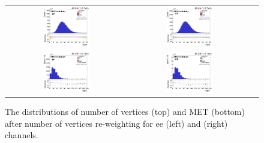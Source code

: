\begin{figure}[ht]
  \begin{center}
    \begin{tabular}{ccc}
      \includegraphics[width=0.4\textwidth]{figures/tW/fig/Step1/ee_Nvtx/H_pv_n.png}&
      \includegraphics[width=0.4\textwidth]{figures/tW/fig/Step1/mumu_Nvtx/H_pv_n.png}\\
      \includegraphics[width=0.4\textwidth]{figures/tW/fig/Step1/ee_Nvtx/H_MET_Et.png}&
      \includegraphics[width=0.4\textwidth]{figures/tW/fig/Step1/mumu_Nvtx/H_MET_Et.png}\\
    \end{tabular}
    \caption{The distributions of number of vertices (top) and MET (bottom) after number of vertices re-weighting for ee (left) and \mumu (right) channels.
    \label{fig:step1_Nvtx_reweight}}
  \end{center}
\end{figure}


